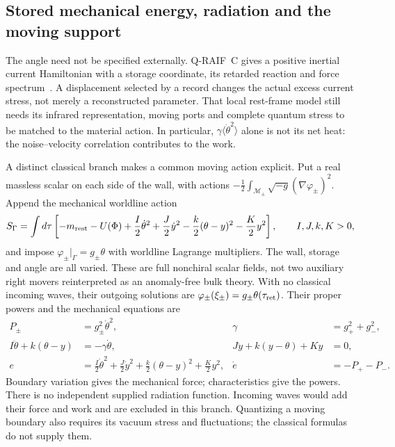 \documentclass[12pt,a4paper]{article}
\begin{document}
\subsection{Stored mechanical energy, radiation and the moving support}
\label{sec:inertial-scalar-support}

The angle need not be specified externally. Q-RAIF~C gives a positive
inertial current Hamiltonian with a storage coordinate, its retarded
reaction and force spectrum~\cite[Section on an inertial contact]{QRC}.
A displacement selected by a record changes the actual excess current
stress, not merely a reconstructed parameter. That local rest-frame
model still needs its infrared representation, moving ports and complete
quantum stress to be matched to the material action. In particular,
$\gamma\langle\dot\theta^2\rangle$ alone is not its net heat: the
noise--velocity correlation contributes to the work.

A distinct classical branch makes a common moving action explicit.
Put a real massless scalar on each side of the wall, with actions
$-\frac12\int_{\mathcal M_\pm}\sqrt{-g}(\nabla\varphi_\pm)^2$.
Append the mechanical worldline action
\begin{equation}\label{eq:scalar-mechanical-action}
 S_\Gamma=\int d\tau\left[-m_{\rm rest}-U(\Phi)
       +\frac I2\dot\theta^2+\frac J2\dot y^2
       -\frac k2(\theta-y)^2-\frac K2 y^2\right],
 \qquad I,J,k,K>0,
\end{equation}
and impose $\varphi_\pm|_\Gamma=g_\pm\theta$ with worldline Lagrange
multipliers. The wall, storage and angle are all varied. These are full
nonchiral scalar fields, not two auxiliary right movers reinterpreted as
an anomaly-free bulk theory. With no classical incoming waves, their
outgoing solutions are $\varphi_\pm(\xi_\pm)=g_\pm\theta(\tau_{\rm ret})$.
Their proper powers and the mechanical equations are
\begin{align}\label{eq:scalar-mechanical-source}
 P_\pm&=g_\pm^2\dot\theta^2,&
 \gamma&=g_+^2+g_-^2,\\
 I\ddot\theta+k(\theta-y)&=-\gamma\dot\theta,&
 J\ddot y+k(y-\theta)+Ky&=0,\nonumber\\
 e&=\tfrac I2\dot\theta^2+\tfrac J2\dot y^2
              +\tfrac k2(\theta-y)^2+\tfrac K2y^2,&
 \dot e&=-P_+-P_- .\nonumber
\end{align}
Boundary variation gives the mechanical force; characteristics give
the powers. There is no independent supplied radiation function.
Incoming waves would add their force and work and are excluded in
this branch. Quantizing a moving boundary also requires its vacuum
stress and fluctuations; the classical formulas do not supply them.
\end{document}
